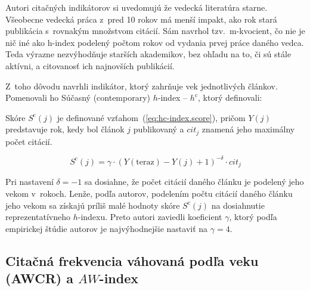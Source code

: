 Autori citačných indikátorov si uvedomujú že vedecká literatúra starne.
Všeobecne vedecká práca z~pred 10 rokov má menší impakt, ako rok stará
publikácia s~rovnakým množstvom citácií.  Sám \citet{Hirsch2005} navrhol
tzv.~m-kvocient, čo nie je nič iné ako h-index podelený počtom rokov od vydania
prvej práce daného vedca.  Teda výrazne nezvýhodňuje starších akademikov, bez
ohľadu na to, či sú stále aktívni, a citovanosť ich najnovších publikácií.

Z~toho dôvodu \citet{Sidiropoulos2007} navrhli indikátor, ktorý zahrňuje vek
jednotlivých článkov.  Pomenovali ho Súčasný (contemporary)
$h$-index -- $h^{\mathrm{c}}$, ktorý definovali:


Skóre $S^{\mathrm{c}}(j)$ je definované vzťahom~(\ref{eq:hc-index.score}),
pričom $Y(j)$ predstavuje rok, kedy bol článok $j$ publikovaný a
$\mathit{cit}_j$ znamená jeho maximálny počet citácií.

\begin{equation}
\label{eq:hc-index.score}
S^{\mathrm{c}}(j) = \gamma\cdot (Y(\mathrm{teraz}) - Y(j) + 1)^{-\delta}\cdot \mathit{cit}_j
\end{equation}

Pri nastavení $\delta = -1$ sa dosiahne, že počet citácií daného článku je
podelený jeho vekom v~rokoch.  Lenže, podľa autorov, podelením počtu citácií
daného článku jeho vekom sa získajú príliš malé hodnoty skóre
$S^{\mathrm{c}}(j)$ na dosiahnutie reprezentatívneho $h$-indexu.  Preto autori
zaviedli koeficient $\gamma$, ktorý podľa empirickej štúdie autorov je
najvýhodnejšie nastaviť na $\gamma = 4$.

\subsection{Citačná frekvencia váhovaná podľa veku (AWCR) a $\mathit{AW}$-index}
\label{sec:aw-index}

